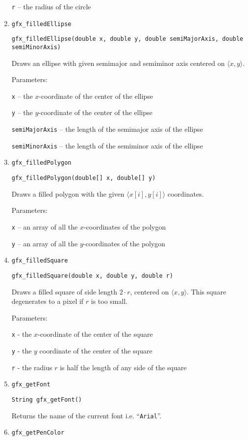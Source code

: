 \begin{enumerate}
      \texttt{r} -- the radius of the circle

\item \texttt{gfx\_filledEllipse}

      \texttt{gfx\_filledEllipse(double x, double y, double semiMajorAxis, double semiMinorAxis)}

      Draws an ellipse with given semimajor and semiminor axis centered on $\langle x,y \rangle$.

      Parameters: 

      \texttt{x} -- the $x$-coordinate of the center of the ellipse

      \texttt{y} -- the $y$-coordinate of the center of the ellipse 

      \texttt{semiMajorAxis} -- the length of the semimajor axis of the ellipse 

      \texttt{semiMinorAxis} -- the length of the semiminor axis of the ellipse
\item \texttt{gfx\_filledPolygon}

      \texttt{gfx\_filledPolygon(double[] x, double[] y)}

      Draws a filled polygon with the given $\langle x[i], y[i] \rangle$ coordinates.

      Parameters:

      \texttt{x} -- an array of all the $x$-coordinates of the polygon 

      \texttt{y} -- an array of all the $y$-coordinates of the polygon
\item \texttt{gfx\_filledSquare}

      \texttt{gfx\_filledSquare(double x, double y, double r)}

      Draws a filled square of side length $2 \cdot r$, centered on $\langle x, y \rangle$.
      This square degenerates to a pixel if $r$ is too small.

      Parameters:

      \texttt{x} - the $x$-coordinate of the center of the square 

      \texttt{y} - the $y$ coordinate of the center of the square 

      \texttt{r} - the radius $r$ is half the length of any side of the square
\item \texttt{gfx\_getFont}

      \texttt{String gfx\_getFont()}

      Returns the name of the current font i.e. ``\texttt{Arial}''.
\item \texttt{gfx\_getPenColor}


\end{enumerate}
